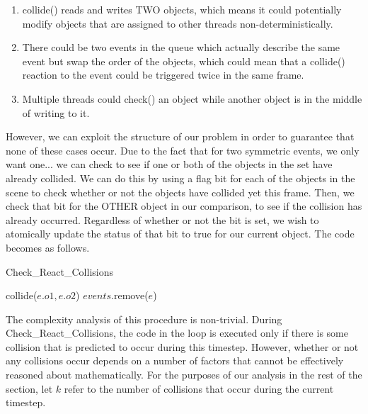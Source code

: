 \documentclass[conference]{IEEEtran}
\begin{document}
\begin{enumerate}
	\item collide() reads and writes TWO objects, which means it could potentially modify objects that are assigned to other threads non-deterministically.
	\item There could be two events in the queue which actually describe the same event but swap the order of the objects, which could mean that a collide() reaction to the event could be triggered twice in the same frame.
	\item Multiple threads could check() an object while another object is in the middle of writing to it.
\end{enumerate}

However, we can exploit the structure of our problem in order to guarantee that none of these cases occur.  Due to the fact that for two symmetric events, we only want one... we can check to see if one or both of the objects in the set have already collided.
We can do this by using a flag bit for each of the objects in the scene to check whether or not the objects have collided yet this frame.  Then, we check
that bit for the OTHER object in our comparison, to see if the collision has already occurred.  Regardless of whether or not the bit is set, we wish to atomically
update the status of that bit to true for our current object.  The code becomes as follows.

\begin{algorithm}
\caption{Check\_React\_Collisions}
\begin{algorithmic}
\STATE {}
	\STATE {}
		\STATE {}
			\STATE {}
			\STATE collide($e.o1,e.o2$)
		\ENDIF
		\STATE {}
		\STATE $events$.remove($e$)
	\ENDIF
\ENDFOR
\end{algorithmic}
\end{algorithm}

The complexity analysis of this procedure is non-trivial.  During Check\_React\_Collisions, the code in the loop is executed only if there is 
some collision that is predicted to occur during this timestep.  However, whether or not any collisions occur depends on a number of factors that
cannot be effectively reasoned about mathematically. For the purposes of our analysis in the rest of the section, let $k$ refer to the number 
of collisions that occur during the current timestep.  
\end{document}
